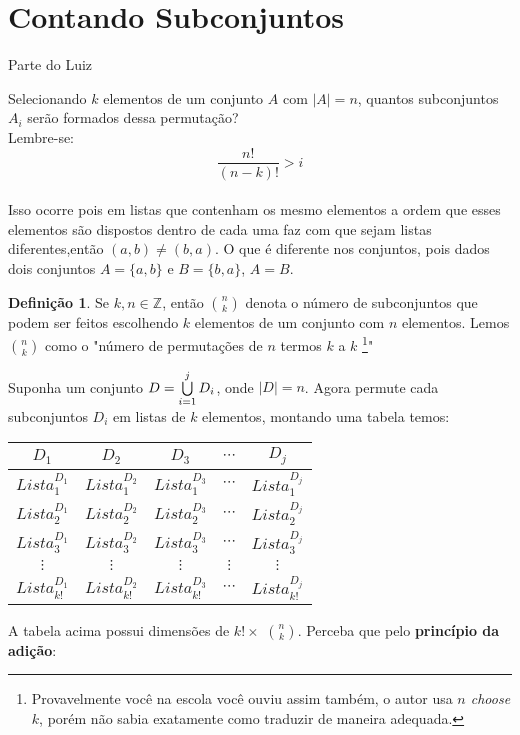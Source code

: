 \documentclass[a4paper,11pt]{book}
\theoremstyle{definition}
\theoremstyle{break}
\newtheorem{definition}{Definição}[section]
\begin{document}
\section{Contando Subconjuntos}
Parte do Luiz

Selecionando $k$ elementos de um conjunto $A$ com $|A| = n$, quantos subconjuntos $A_i$ serão formados dessa permutação?
\\
Lembre-se:
\\
$$\frac{n!}{(n-k)!} > i$$
\\
Isso ocorre pois em listas que contenham os mesmo elementos a ordem que esses elementos são dispostos dentro de cada uma faz com que sejam listas diferentes,então $(a,b)\neq(b,a)$. O que é diferente nos conjuntos, pois dados dois conjuntos $A = \lbrace a,b \rbrace$ e $B = \lbrace b,a \rbrace$, $A=B$.
\\
\begin{definition}
	Se $k,n \in \mathbb{Z}$, então $n \choose k$ denota o número de subconjuntos que podem ser feitos escolhendo $k$ elementos de um conjunto com $n$ elementos. Lemos $n \choose k$ como o "número de permutações de $n$ termos $k$ a $k$ \footnote{Provavelmente você na escola você ouviu assim também, o autor usa \textit{$n$ choose $k$}, porém não sabia exatamente como traduzir de maneira adequada.}"
\end{definition}
Suponha um conjunto $D = \bigcup_{i = 1}^{j}\limits D_i$, onde $|D| = n$. Agora permute cada subconjuntos $D_i$ em listas de $k$ elementos, montando uma tabela temos:
\begin{center}
\begin{tabular}{|c || c || c || c || c|}
$D_1$ & $D_2$ & $D_3$ & $\cdots$ & $D_j$ \\
\hline
$Lista_1^{D_1}$ & $Lista_1^{D_2}$ & $Lista_1^{D_3}$ & $\cdots$ & $Lista_1^{D_j}$\\
$Lista_2^{D_1}$ & $Lista_2^{D_2}$ & $Lista_2^{D_3}$ & $\cdots$ & $Lista_2^{D_j}$\\
$Lista_3^{D_1}$ & $Lista_3^{D_2}$ & $Lista_3^{D_3}$ & $\cdots$ & $Lista_3^{D_j}$\\
$\vdots$ & $\vdots$ & $\vdots$ & $\vdots$ & $\vdots$\\
$Lista_{k!}^{D_1}$ & $Lista_{k!}^{D_2}$ & $Lista_{k!}^{D_3}$ & $\cdots$ & $Lista_{k!}^{D_j}$\\
\end{tabular}
\end{center}
A tabela acima possui dimensões de $k! \times$ $ n \choose k$. Perceba que pelo \textbf{princípio da adição}:
\end{document}
